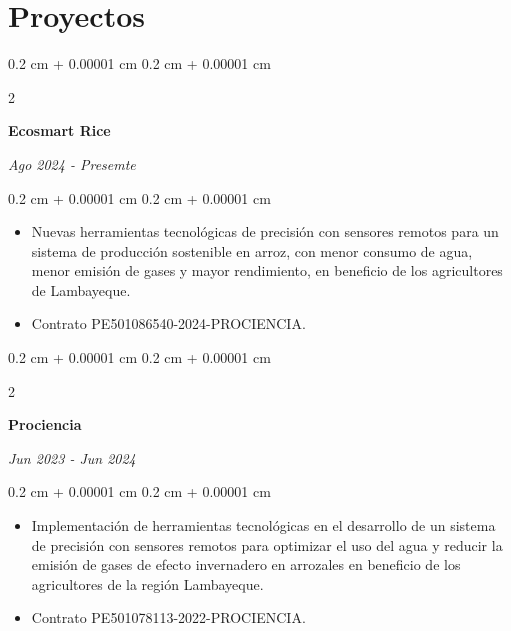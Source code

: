 \documentclass[10pt, letterpaper]{article}
\newenvironment{highlights}{
    \begin{itemize}[
        topsep=0.10 cm,
        parsep=0.10 cm,
        partopsep=0pt,
        itemsep=0pt,
        leftmargin=0.4 cm + 10pt
    ]
}{
    \end{itemize}
} %
\newenvironment{onecolentry}{
    \begin{adjustwidth}{
        0.2 cm + 0.00001 cm
    }{
        0.2 cm + 0.00001 cm
    }
}{
    \end{adjustwidth}
} %
\newenvironment{twocolentry}[2][]{
    \onecolentry
    \def\secondColumn{#2}
    \setcolumnwidth{\fill, 4.5 cm}
    \begin{paracol}{2}
}{
    \switchcolumn \raggedleft \secondColumn
    \end{paracol}
    \endonecolentry
} %
\begin{document}
    
    \section{Proyectos}



        
        \begin{twocolentry}{
                \textit{Ago 2024 - Presemte}
            }
            \textbf{Ecosmart Rice}
        \end{twocolentry}

        \vspace{0.10 cm}
        \begin{onecolentry}
            \begin{highlights}
                \item Nuevas herramientas tecnológicas de precisión con sensores remotos para un sistema de producción sostenible en arroz, con menor consumo de agua, menor emisión de gases y mayor rendimiento, en beneficio de los agricultores de Lambayeque.
                \item Contrato PE501086540-2024-PROCIENCIA.
            \end{highlights}
        \end{onecolentry}

        \vspace{0.2 cm}

        \begin{twocolentry}{
                \textit{Jun 2023 - Jun 2024}
            }
            \textbf{Prociencia}
        \end{twocolentry}

        \vspace{0.10 cm}
        \begin{onecolentry}
            \begin{highlights}
                \item Implementación de herramientas tecnológicas en el desarrollo de un sistema de precisión con sensores remotos para optimizar el uso del agua y reducir la emisión de gases de efecto invernadero en arrozales en beneficio de los agricultores de la región Lambayeque.
                \item Contrato PE501078113-2022-PROCIENCIA.
            \end{highlights}
        \end{onecolentry}
\end{document}
